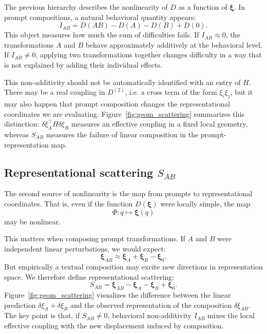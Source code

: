 \documentclass[10pt,twocolumn]{article}
\newcommand{\xrep}{\bm{\xi}}
\begin{document}
The previous hierarchy describes the nonlinearity of \(D\) as a function of \(\xrep\). In prompt compositions, a natural behavioral quantity appears:
\[
I_{AB}
=
D(AB)-D(A)-D(B)+D(0).
\]
This object measures how much the sum of difficulties fails. If \(I_{AB}\approx0\), the transformations \(A\) and \(B\) behave approximately additively at the behavioral level. If \(I_{AB}\neq0\), applying two transformations together changes difficulty in a way that is not explained by adding their individual effects.

This non-additivity should not be automatically identified with an entry of \(H\). There may be a real coupling in \(D^{(2)}\), i.e. a cross term of the form \(\xi_i\xi_j\), but it may also happen that prompt composition changes the representational coordinates we are evaluating. Figure~\ref{fig:geom_scattering} summarizes this distinction: \(\delta\xi_A^\top H\delta\xi_B\) measures an effective coupling in a fixed local geometry, whereas \(S_{AB}\) measures the failure of linear composition in the prompt-representation map.

\subsection{Representational scattering \texorpdfstring{\(S_{AB}\)}{SAB}}

The second source of nonlinearity is the map from prompts to representational coordinates. That is, even if the function \(D(\xrep)\) were locally simple, the map
\[
\Phi:q\longmapsto\xrep(q)
\]
may be nonlinear.

This matters when composing prompt transformations. If \(A\) and \(B\) were independent linear perturbations, we would expect:
\[
\xrep_{AB}
\approx
\xrep_A+\xrep_B-\xrep_0.
\]
But empirically a textual composition may excite new directions in representation space. We therefore define representational scattering:
\[
S_{AB}
=
\xrep_{AB}
-\xrep_A
-\xrep_B
+\xrep_0.
\]
Figure~\ref{fig:geom_scattering} visualizes the difference between the linear prediction \(\delta\xi_A+\delta\xi_B\) and the observed representation of the composition \(\delta\xi_{AB}\). The key point is that, if \(S_{AB}\neq0\), behavioral non-additivity \(I_{AB}\) mixes the local effective coupling with the new displacement induced by composition.
\end{document}
